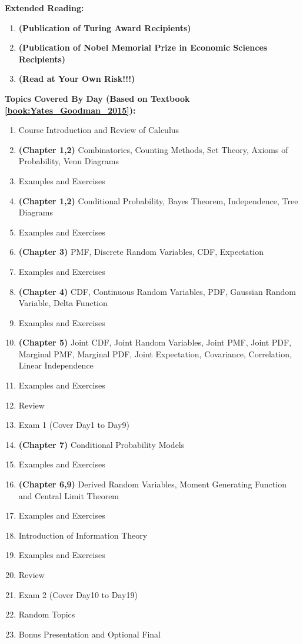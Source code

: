 \documentclass{article}
\begin{document}
\textbf{Extended Reading:}{
    \begin{enumerate}
            \item \textbf{(Publication of Turing Award Recipients)} 
            \item \textbf{(Publication of Nobel Memorial Prize in Economic Sciences Recipients)} 
            \item \textbf{(Read at Your Own Risk!!!)} 
    \end{enumerate}
}

\textbf{Topics Covered By Day (Based on Textbook \cref{book:Yates_Goodman_2015}):} {
    \begin{enumerate}
        \item Course Introduction and Review of Calculus
        \item \textbf{(Chapter 1,2)} Combinatorics, Counting Methods, Set Theory, Axioms of Probability, Venn Diagrams
        \item Examples and Exercises
        \item \textbf{(Chapter 1,2)} Conditional Probability, Bayes Theorem, Independence, Tree Diagrams
        \item Examples and Exercises
        \item \textbf{(Chapter 3)} PMF, Discrete Random Variables, CDF, Expectation
        \item Examples and Exercises
        \item \textbf{(Chapter 4)} CDF, Continuous Random Variables, PDF, Gaussian Random Variable, Delta Function
        \item Examples and Exercises
        \item \textbf{(Chapter 5)} Joint CDF, Joint Random Variables, Joint PMF, Joint PDF, Marginal PMF, Marginal PDF, Joint Expectation, Covariance, Correlation, Linear Independence
        \item Examples and Exercises
        \item Review
        \item Exam 1 (Cover Day1 to Day9)
        \item \textbf{(Chapter 7)} Conditional Probability Models
        \item Examples and Exercises
        \item \textbf{(Chapter 6,9)} Derived Random Variables, Moment Generating Function and Central Limit Theorem
        \item Examples and Exercises
        \item Introduction of Information Theory
        \item Examples and Exercises
        \item Review
        \item Exam 2 (Cover Day10 to Day19)
        \item Random Topics
        \item Bonus Presentation and Optional Final
    \end{enumerate}
}
\end{document}
